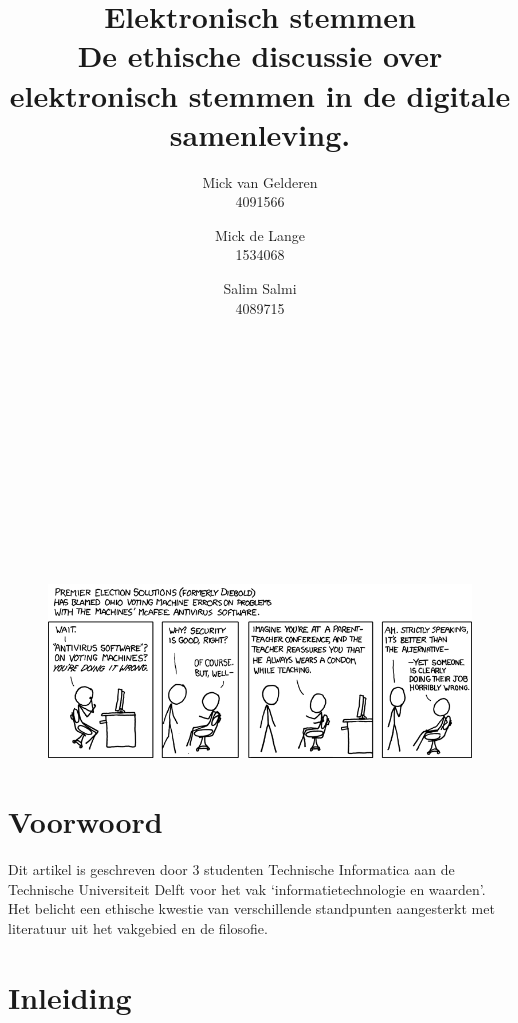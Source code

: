 \documentclass[a4paper]{article}
\title{Elektronisch stemmen \\ \large De ethische discussie over elektronisch stemmen in de digitale samenleving.}
\author{
	Mick van Gelderen \\ 4091566 \and 
	Mick de Lange \\ 1534068 \and
	Salim Salmi \\ 4089715
}
\begin{document}
\maketitle

\hfill \\ \\ \\ \\ \\ \\ \\ \\ \\ \\
\begin{figure}[htp]
	\centering
	\includegraphics[width=\textwidth]{media/voting_machines.png}
	\label{fig:voting-machines}

\end{figure}

\thispagestyle{empty}
\setcounter{page}{0}
\newpage

\section*{Voorwoord}
Dit artikel is geschreven door 3 studenten Technische Informatica aan de Technische Universiteit Delft voor het vak `informatietechnologie en waarden'.
Het belicht een ethische kwestie van verschillende standpunten aangesterkt met literatuur uit het vakgebied en de filosofie. 

\thispagestyle{empty}
\newpage

\begingroup
\hypersetup{linkcolor=black}
\tableofcontents
\endgroup

\thispagestyle{empty}
\newpage

\section{Inleiding}
\end{document}
